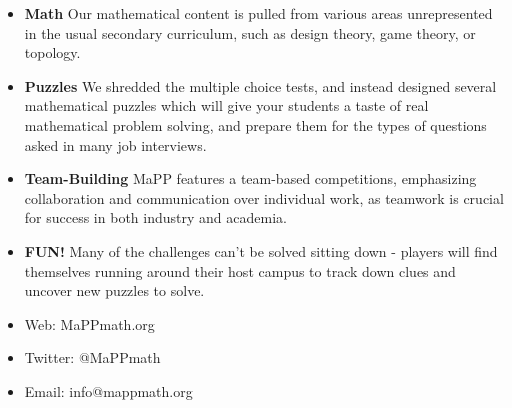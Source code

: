 \documentclass{puzzlehunt}
\begin{document}
\begin{itemize}
\item \textbf{Math}\newline
Our mathematical content is pulled from various areas unrepresented in the
usual secondary curriculum,
such as design theory, game theory, or topology.

\item \textbf{Puzzles}\newline
We shredded the multiple choice tests, and instead designed several
mathematical puzzles which will
give your students a taste of real mathematical problem solving, and prepare
them for the types of questions asked in many job interviews.

\item \textbf{Team-Building}\newline
MaPP features a team-based competitions, emphasizing collaboration and
communication over individual work, as teamwork is crucial for success in both
industry and academia.

\item \textbf{FUN!}\newline
Many of the challenges can't be solved sitting down - players will find
themselves running around their
host campus to track down clues and uncover new puzzles to solve.
\end{itemize}

\vspace{2em}


  \begin{itemize}
  \item Web: MaPPmath.org
  \item Twitter: @MaPPmath
  \item Email: info@mappmath.org
  \end{itemize}
\end{document}
